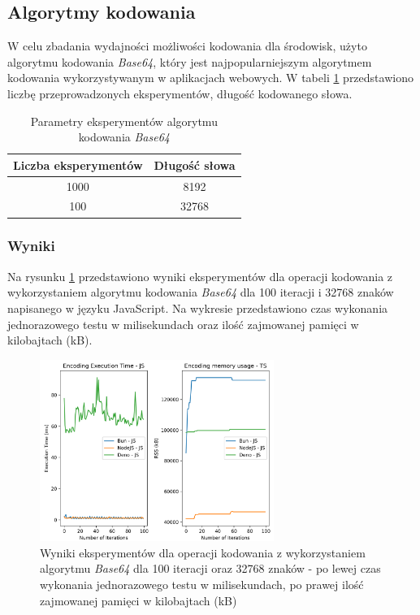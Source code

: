 \subsection{Algorytmy kodowania}
W celu zbadania wydajności możliwości kodowania dla środowisk, użyto algorytmu kodowania \textit{Base64}, który jest najpopularniejszym algorytmem kodowania wykorzystywanym w aplikacjach webowych. W tabeli \ref{tab:encoding_experiments} przedstawiono liczbę przeprowadzonych eksperymentów, długość kodowanego słowa.

\begin{table}[H]
  \centering
  \caption{Parametry eksperymentów algorytmu kodowania \textit{Base64}}
  \begin{tabular}{|c|c|}
    \hline
    \textbf{Liczba eksperymentów} & \textbf{Długość słowa}\\ \hline
    1000 & 8192 \\ \hline
    100 & 32768 \\ \hline
  \end{tabular}
  \label{tab:encoding_experiments}
\end{table}

\subsubsection{Wyniki}
Na rysunku \ref{fig:encoding_e1_js} przedstawiono wyniki eksperymentów dla operacji kodowania z wykorzystaniem algorytmu kodowania \textit{Base64} dla 100 iteracji i 32768 znaków napisanego w języku JavaScript. Na wykresie przedstawiono czas wykonania jednorazowego testu w milisekundach oraz ilość zajmowanej pamięci w kilobajtach (kB).

\begin{figure}[H]
  \centering
  \includegraphics[width=0.68\textwidth]{Figures/coding/base64_100_encoding_js.png}
  \caption{Wyniki eksperymentów dla operacji kodowania z wykorzystaniem algorytmu \textit{Base64} dla 100 iteracji oraz 32768 znaków - po lewej czas wykonania jednorazowego testu w milisekundach, po prawej ilość zajmowanej pamięci w kilobajtach (kB)}
  \label{fig:encoding_e1_js}
\end{figure}

